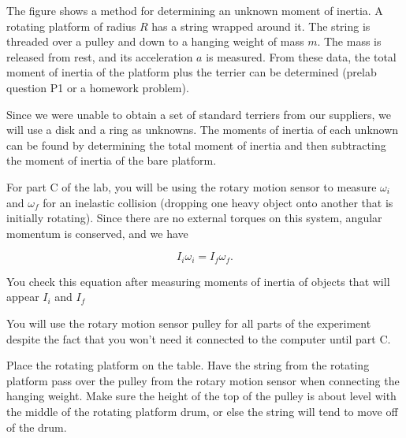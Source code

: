 \label{lab:moment-of-inertia-brian}

\apparatus
{}


\introduction

The figure shows a method for determining an unknown moment of inertia.
A rotating platform of radius $R$ has
a string wrapped around it. The string is threaded over a pulley and
down to a hanging weight of mass $m$. The mass is released from rest,
and its acceleration $a$ is measured. From these data, the total moment
of inertia of the platform plus the terrier can be determined (prelab question
P1 or a homework problem).


Since we were unable to obtain a set of standard terriers from our
suppliers, we will use a disk and a ring as unknowns. The moments of
inertia of each unknown can be found by determining the total moment
of inertia and then subtracting the moment of inertia of the bare platform.

For part C of the lab, you will be using the rotary motion sensor to
measure $\omega_i$ and $\omega_f$ for an inelastic collision (dropping
one heavy object onto another that is initially rotating). Since there
are no external torques on this system, angular momentum is conserved,
and we have

\begin{equation*}
I_i \omega_i = I_f \omega_f.
\end{equation*}

You check this equation after measuring moments of
inertia of objects that will appear $I_i$ and $I_f$

\setup

You will use the rotary motion sensor pulley for all parts of the
experiment despite the fact that you won't need it connected to the
computer until part C. 

Place the rotating platform on the table. Have the string from the
rotating platform pass over the pulley from the rotary motion sensor
when connecting the hanging weight. Make sure the height of the top of
the pulley is about level with the middle of the rotating platform
drum, or else the string will tend to move off of the drum. 

